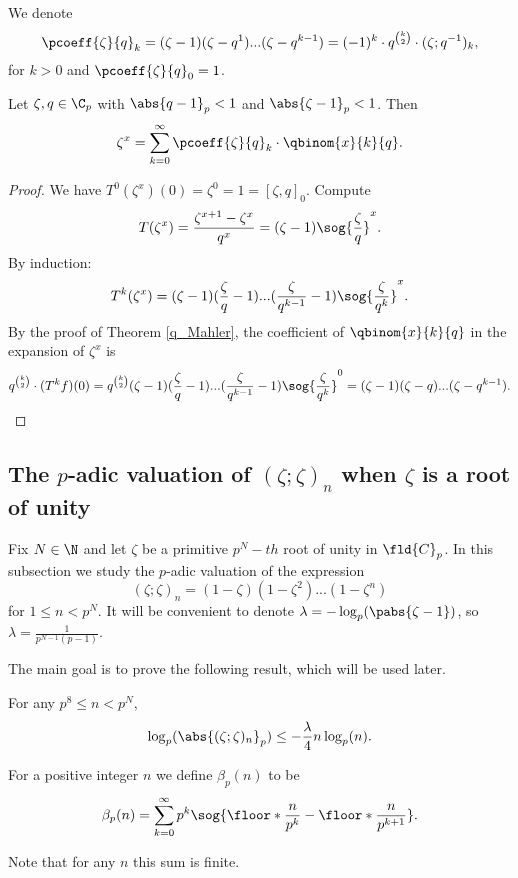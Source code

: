 \begin{defn}
We denote 
\[\pcoeff{\zeta}{q}_k=(\zeta-1)(\zeta-q^1)...(\zeta-q^{k-1})=(-1)^k\cdot q^{\binom{k}{2}}\cdot (\zeta;q^{-1})_k,\]
for $k>0$ and $\pcoeff{\zeta}{q}_0=1$.


\end{defn} 
\begin{cor}\label{q_expansion_of_powers}
Let $\zeta,q\in\C_p$ with $\abs{q-1}_p<1$ and $\abs{\zeta-1}_p<1$.
Then
\[\zeta^x=\sum_{k=0}^\infty \pcoeff{\zeta}{q}_k\cdot\qbinom{x}{k}{q}.\]
\end{cor} 
    \begin{proof}
    We have $T^0(\zeta^x)(0)=\zeta^0=1=[\zeta,q]_0$.
    Compute 
    \[T(\zeta^x)=\frac{\zeta^{x+1}-\zeta^x}{q^x}=(\zeta-1)\sog{\frac{\zeta}{q}}^x.\]
    By induction:
    \[T^k(\zeta^x)=(\zeta-1)(\frac{\zeta}{q}-1)...(\frac{\zeta}{q^{k-1}}-1)\sog{\frac{\zeta}{q^k}}^x.\]
    By the proof of Theorem \ref{q_Mahler}, the coefficient of $\qbinom{x}{k}{q}$ in the expansion of $\zeta^x$ is 
    \[q^{\binom{k}{2}}\cdot (T^kf)(0)=q^{\binom{k}{2}}(\zeta-1)(\frac{\zeta}{q}-1)...(\frac{\zeta}{q^{k-1}}-1)\sog{\frac{\zeta}{q^k}}^0=(\zeta-1)(\zeta-q)...(\zeta-q^{k-1}).\]
    \end{proof} 



\subsection{The $p$-adic valuation of $(\zeta;\zeta)_n$ when $\zeta$ is a root of unity}
Fix $N\in \N$ and let $\zeta$ be a primitive $p^{N}-th$ root of unity in $\fld{C}_p$. 
In this subsection we study the $p$-adic valuation of the expression
\[(\zeta;\zeta)_n=(1-\zeta)(1-\zeta^2)...(1-\zeta^n)\]
for $1\leq n<p^N$.
It will be convenient to denote $\lambda=-\log_p(\pabs{\zeta-1})$, so $\lambda=\frac{1}{p^{N-1}(p-1)}$.

The main goal is to prove the following result, which will be used later.
\begin{prop}\label{q_analog_evaluations_cor}
For any $p^8\leq n<p^N$,
\[\log_p(\abs{(\zeta;\zeta)_n}_p)\leq -\frac{\lambda}{4}n\log_p(n).\]
\end{prop} 

\begin{defn}
For a positive integer $n$ we define $\beta_p(n)$ to be
\[
\beta_p(n)=
\sum_{k=0}^{\infty}p^k\sog{\floor*{\frac{n}{p^k}}-\floor*{\frac{n}{p^{k+1}}}}.
\]
\end{defn}
Note that for any $n$ this sum is finite.

